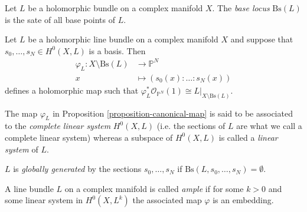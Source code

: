\begin{definition}
\label{definition-base-locus}
\begin{reference}
\cite[Definition 2.3.25]{huc}
\end{reference}
Let $L$ be a holomorphic bundle on a complex manifold $X$. 
The {\it base locus} $\text{Bs}(L)$ is the sate of all base points of $L$.
\end{definition}

\begin{proposition}
\label{proposition-canonical-map}
\begin{reference}
\cite[Proposition 2.3.26]{huc}
\end{reference}
Let $L$ be a holomorphic line bundle on a complex manifold $X$ and suppose that
$s_0,\ldots,s_N\in H^{0}(X,L)$ is a basis. Then
\begin{align*}
\varphi_L: X\setminus\text{Bs}(L) &\longrightarrow \mathbb{P}^N \\
x &\longmapsto (s_0(x):\ldots:s_N(x))
\end{align*}
defines a holomorphic map such that $\varphi^*
_L\mathcal{O}_{\mathbb{P}^N}(1)\cong L|_{X\setminus\text{Bs}(L)}$.
\end{proposition}

\begin{definition}
\label{definition-linear-system}
\begin{reference}
\cite[p. 86]{huc}
\end{reference}
The map $\varphi_L$ in Proposition \ref{proposition-canonical-map} is said to be
associated to the {\it complete linear system} $H^{0}(X,L)$ (i.e. the sections
of $L$ are what we call a complete linear system) whereas a subspace of 
$H^{0}(X,L)$ is called a {\it linear system} of $L$.
\end{definition}

\begin{definition}
\label{definition-globally-generated}
\begin{reference}
\cite[p. 86]{huc}
\end{reference}
$L$ is {\it globally generated} by the sections $s_0,\ldots,s_N$ if
$\text{Bs}(L,s_0,\ldots,s_N)=\emptyset$.
\end{definition}

\begin{definition}
\label{definition-ample}
\begin{reference}
\cite[Definition 2.3.28]{huc}
\end{reference}
A line bundle $L$ on a complex manifold is called {\it ample} if for some $k>0$
and some linear system in $H^{0}(X,L^k)$ the associated map $\varphi$ is an
embedding.
\end{definition}

